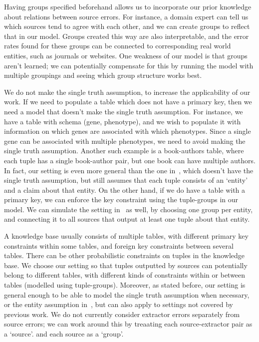 \documentclass{sig-alternate}
\newcounter{prob}
\begin{document}
Having groups specified beforehand allows us to incorporate our prior knowledge about relations between source errors. For instance, a domain expert can tell us which sources tend to agree with each other, and we can create groups to reflect that in our model. Groups created this way are also interpretable, and the error rates found for these groups can be connected to corresponding real world entities, such as journals or websites. One weakness of our model is that groups aren't learned; we can potentially compensate for this by running the model with multiple groupings and seeing which group structure works best. 

We do not make the single truth assumption, to increase the applicability of our work. If we need to populate a table which does not have a primary key, then we need a model that doesn't make the single truth assumption. For instance, we have a table with schema (gene, phenotype), and we wish to populate it with information on which genes are associated with which phenotypes. Since a single gene can be associated with multiple phenotypes, we need to avoid making the single truth assumption. Another such example is a book-authors table, where each tuple has a single book-author pair, but one book can have multiple authors. In fact, our setting is even more general than the one in~\cite{Zhao:2012:BAD:2168651.2168656}, which doesn't have the single truth assumption, but still assumes that each tuple consists of an `entity' and a claim about that entity. 
On the other hand, if we do have a table with a primary key, we can enforce the key constraint using the tuple-groups in our model. We can simulate the setting in~\cite{Zhao:2012:BAD:2168651.2168656} as well, by choosing one group per entity, and connecting it to all sources that output at least one tuple about that entity. 

A knowledge base usually consists of multiple tables, with different primary key constraints within some tables, and foreign key constraints between several tables.
There can be other probabilistic constraints on tuples in the knowledge base. We choose our setting so that tuples outputted by sources can potentially belong to different tables, with different kinds of constraints within or between tables (modelled using tuple-groups). Moreover, as stated before, our setting is general enough to be able to model the single truth assumption when necessary, or the entity assumption in~\cite{Zhao:2012:BAD:2168651.2168656}, but can also apply to settings not covered by previous work. We do not currently consider extractor errors separately from source errors; we can work around this by treaating each source-extractor pair as a `source'. and each source as a `group'. 
\end{document}
